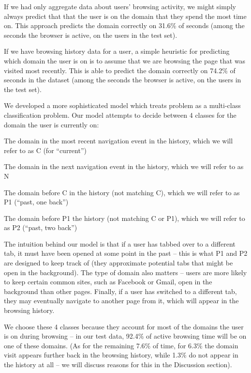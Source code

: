 \documentclass{sigchi}
\begin{document}
If we had only aggregate data about users' browsing activity, we might simply always predict that that the user is on the domain that they spend the most time on. This approach predicts the domain correctly on 31.6\% of seconds (among the seconds the browser is active, on the users in the test set).

If we have browsing history data for a user, a simple heuristic for predicting which domain the user is on is to assume that we are browsing the page that was visited most recently. This is able to predict the domain correctly on 74.2\% of seconds in the dataset (among the seconds the browser is active, on the users in the test set).

We developed a more sophisticated model which treats problem as a multi-class classification problem. Our model attempts to decide between 4 classes for the domain the user is currently on:

\begin{compactitem}
    \item The domain in the most recent navigation event in the history, which we will refer to as C (for ``current'')
    \item The domain in the next navigation event in the history, which we will refer to as N
    \item The domain before C in the history (not matching C), which we will refer to as P1 (``past, one back'')
    \item The domain before P1 the history (not matching C or P1), which we will refer to as P2 (``past, two back'')
\end{compactitem}

The intuition behind our model is that if a user has tabbed over to a different tab, it must have been opened at some point in the past -- this is what P1 and P2 are designed to keep track of (they approximate potential tabs that might be open in the background). The type of domain also matters -- users are more likely to keep certain common sites, such as Facebook or Gmail, open in the background than other pages. Finally, if a user has switched to a different tab, they may eventually navigate to another page from it, which will appear in the browsing history.

We choose these 4 classes because they account for most of the domains the user is on during browsing -- in our test data, 92.4\% of active browsing time will be on one of these domains. (As for the remaining 7.6\% of time, for 6.3\% the domain visit appears further back in the browsing history, while 1.3\% do not appear in the history at all -- we will discuss reasons for this in the Discussion section).
\end{document}
